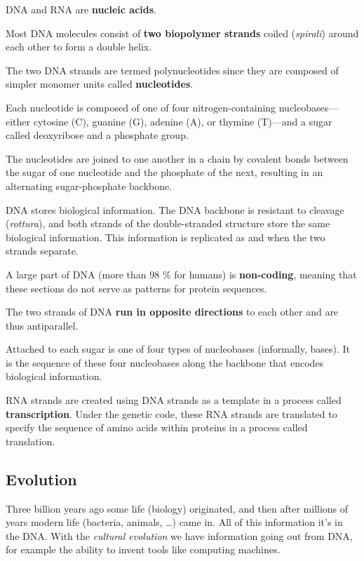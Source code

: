 DNA and RNA are \textbf{nucleic acids}.

Most DNA molecules consist of \textbf{two biopolymer strands} coiled (\textit{spirali}) 
around each other to form a double helix.

The two DNA strands are termed polynucleotides since they are composed of simpler monomer 
units called \textbf{nucleotides}.

Each nucleotide is composed of one of four nitrogen-containing nucleobases—either 
cytosine (C), guanine (G), adenine (A), or thymine (T)—and a sugar called deoxyribose 
and a phosphate group. 

The nucleotides are joined to one another in a chain by covalent bonds between the sugar 
of one nucleotide and the phosphate of the next, resulting in an alternating sugar-phosphate 
backbone.

DNA stores biological information. 
The DNA backbone is resistant to cleavage (\textit{rottura}), and both strands of the 
double-stranded structure store the same biological information. 
This information is replicated as and when the two strands separate. 

A large part of DNA (more than 98 \% for humans) is \textbf{non-coding}, meaning that these 
sections do not serve as patterns for protein sequences.

The two strands of DNA \textbf{run in opposite directions} to each other and are thus 
antiparallel. 

Attached to each sugar is one of four types of nucleobases (informally, bases). 
It is the sequence of these four nucleobases along the backbone that encodes biological 
information.

RNA strands are created using DNA strands as a template in a process called \textbf{transcription}. 
Under the genetic code, these RNA strands are translated to specify the sequence of amino 
acids within proteins in a process called translation.

\subsection{Evolution}

Three billion years ago some life (biology) originated, and then after millions
of years modern life (bacteria, animals, \dots) came in. All of this information
it's in the DNA. With the \textit{cultural evolution} we have information going
out from DNA, for example the ability to invent tools like computing machines.

